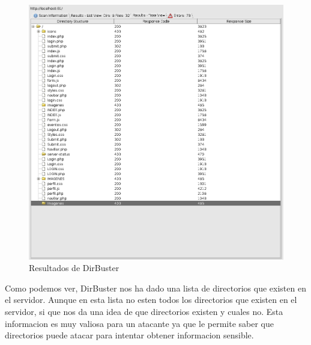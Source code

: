 \documentclass{report}
\begin{document}
                \begin{figure}[H]
                    \centering
                    \includegraphics[width=1\textwidth]{./img/vulnerabilidades/2.4/2.2.png}
                    \caption{Resultados de DirBuster}
                \end{figure}
                Como podemos ver, DirBuster nos ha dado una lista de directorios que existen en el servidor.
                Aunque en esta lista no esten todos los directorios que existen en el servidor, si que nos da una idea de que directorios existen y cuales no.
                Esta informacion es muy valiosa para un atacante ya que le permite saber que directorios puede atacar para intentar obtener informacion sensible.\\
            \clearpage
\end{document}
